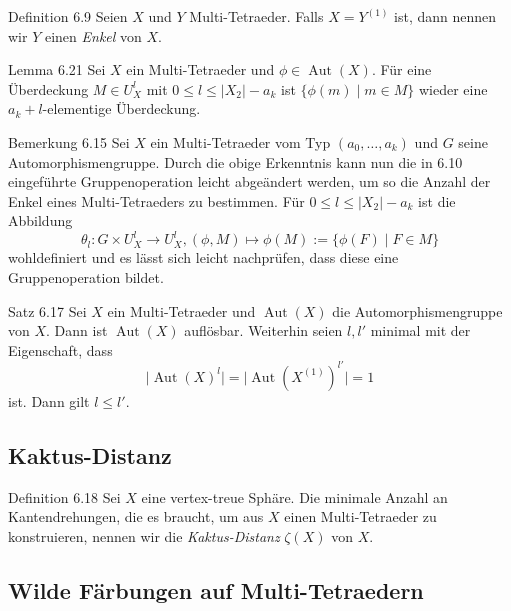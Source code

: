 \documentclass{beamer}
\DeclareMathOperator{\Aut}{Aut}
\begin{document}
\begin{frame}
\begin{block}{Definition 6.9}
Seien $X$ und $Y$ Multi-Tetraeder. Falls $X=Y^{(1)}$ ist, dann nennen wir $Y$ einen \emph{Enkel} von $X.$ 
\end{block}
\end{frame}
\begin{frame}
\begin{block}{Lemma 6.21}
Sei $X$ ein Multi-Tetraeder und $\phi \in \Aut(X).$ Für eine Überdeckung $M\in U_X^l$ mit  $0\leq l\leq \vert X_2\vert -a_k$ ist $\{\phi(m)\mid m\in M\}$ wieder eine $a_k+l$-elementige Überdeckung.
\end{block}
\end{frame}
\begin{frame}
\begin{block}{Bemerkung 6.15}
Sei $X$ ein Multi-Tetraeder vom Typ $(a_0,\ldots ,a_k)$ und $G$ seine Automorphismengruppe.
Durch die obige Erkenntnis kann nun die in 6.10 eingeführte Gruppenoperation leicht abgeändert werden, um so die Anzahl der Enkel eines Multi-Tetraeders zu bestimmen. Für $0\leq l\leq \vert X_2 \vert -a_k$ ist die Abbildung
\[
\theta_l: G\times U_X^l \to U_X^l, (\phi, M)\mapsto \phi(M):=\{\phi(F)\mid F\in M\}
\] 
wohldefiniert und es lässt sich leicht nachprüfen, dass diese eine Gruppenoperation bildet.
\end{block}
\end{frame}
\begin{frame}
\begin{block}{Satz 6.17}
Sei $X$ ein Multi-Tetraeder und $\Aut(X)$ die Automorphismengruppe von $X$. Dann ist $\Aut(X)$ auflösbar.
Weiterhin seien $l,l'$ minimal mit der Eigenschaft, dass
\[
\vert \Aut(X)^l\vert=\vert \Aut(X^{(1)})^{l'}\vert =1
\] ist. Dann gilt $l\leq l'$.
\end{block}
\end{frame}
\subsection{Kaktus-Distanz}
\begin{frame}
\begin{block}{Definition 6.18}
Sei $X$ eine vertex-treue Sphäre. Die minimale Anzahl an Kantendrehungen, die es braucht, um aus $X$ einen Multi-Tetraeder zu  konstruieren, nennen wir die \emph{Kaktus-Distanz} $\zeta(X)$ von $X$.
\end{block}
\end{frame}
\subsection{Wilde Färbungen auf Multi-Tetraedern}
\end{document}
